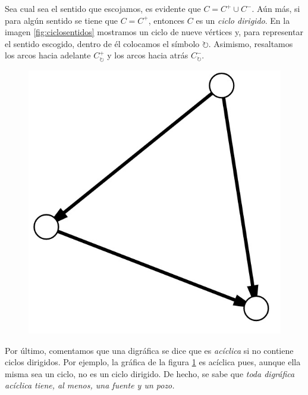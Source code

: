 Sea cual sea el sentido que escojamos, es evidente que $C = C^{+} \cup C^{-}$. Aún más, si para algún sentido se tiene que $C=C^{+}$, entonces $C$ es un \textit{ciclo dirigido}. En la imagen \ref{fig:ciclosentidos} mostramos un ciclo de nueve vértices y, para representar el sentido escogido, dentro de él colocamos el símbolo $\mathbf{\circlearrowright}$. Asimismo, resaltamos los arcos hacia adelante $C^{+}_{\mathbf{\circlearrowright}}$ y los arcos hacia atrás $C^{-}_{\mathbf{\circlearrowright}}$. 


\begin{figure}
\vspace{-0.5 cm}
 \centering
  \includegraphics[scale=0.22]{img/imgchapter1/digrafoaciclico.jpg}
  \caption{}
  \label{fig:digrafoaciclico}
\end{figure}

Por último, comentamos que una digráfica se dice que es \textit{acíclica} si no contiene ciclos dirigidos. Por ejemplo, la gráfica de la figura \ref{fig:digrafoaciclico} es acíclica pues, aunque ella misma sea un ciclo, no es un ciclo dirigido. De hecho, se sabe que \textit{toda digráfica acíclica tiene, al menos, una fuente y un pozo.}